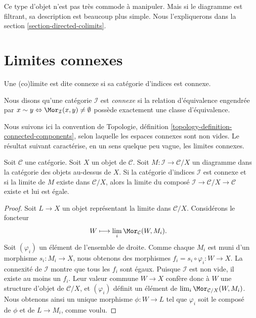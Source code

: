 \medskip\noindent
Ce type d'objet n'est pas très commode à manipuler.
Mais si le diagramme est filtrant, sa description est beaucoup plus simple.
Nous l'expliquerons dans la section \ref{section-directed-colimits}.



\section{Limites connexes}
\label{section-connected-limits}

\noindent
Une (co)limite est dite connexe si sa catégorie d'indices est connexe.

\begin{definition}
\label{definition-category-connected}
Nous disons qu'une catégorie $\mathcal{I}$ est {\it connexe}
si la relation d'équivalence engendrée par
$x \sim y \Leftrightarrow \Mor_\mathcal{I}(x, y) \not = \emptyset$
possède exactement une classe d'équivalence.
\end{definition}

\noindent
Nous suivons ici la convention de
Topologie, définition \ref{topology-definition-connected-components},
selon laquelle les espaces connexes sont non vides.
Le résultat suivant caractérise, en un sens quelque peu vague,
les limites connexes.

\begin{lemma}
\label{lemma-connected-limit-over-X}
Soit $\mathcal{C}$ une catégorie.
Soit $X$ un objet de $\mathcal{C}$.
Soit $M : \mathcal{I} \to \mathcal{C}/X$ un diagramme
dans la catégorie des objets au-dessus de $X$.
Si la catégorie d'indices $\mathcal{I}$ est connexe
et si la limite de $M$ existe dans $\mathcal{C}/X$,
alors la limite du composé
$\mathcal{I} \to \mathcal{C}/X \to \mathcal{C}$
existe et lui est égale.
\end{lemma}

\begin{proof}
Soit $L \to X$ un objet représentant la limite dans $\mathcal{C}/X$.
Considérons le foncteur
$$
W \longmapsto \lim_i \Mor_\mathcal{C}(W, M_i).
$$
Soit $(\varphi_i)$ un élément de l'ensemble de droite.
Comme chaque $M_i$ est muni d'un morphisme $s_i : M_i \to X$, nous
obtenons des morphismes $f_i = s_i \circ \varphi_i : W \to X$.
La connexité de $\mathcal{I}$ montre que tous les $f_i$ sont égaux.
Puisque $\mathcal{I}$ est non vide, il existe au moins un $f_i$.
Leur valeur commune $W \to X$ confère donc à $W$ une structure
d'objet de $\mathcal{C}/X$, et $(\varphi_i)$ définit un
élément de $\lim_i \Mor_{\mathcal{C}/X}(W, M_i)$.
Nous obtenons ainsi un unique morphisme $\phi : W \to L$ tel que
$\varphi_i$ soit le composé de $\phi$ et de $L \to M_i$, comme voulu.
\end{proof}

